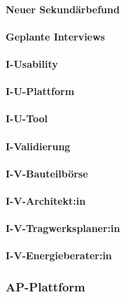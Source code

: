 \documentclass[type=zwischenbericht]{zukunftbau}
\begin{document}
\paragraph{Neuer Sekundärbefund}
\begin{SemioNest}
\paragraph{Geplante Interviews}
\begin{SemioNest}
\paragraph{I-Usability}
\begin{SemioNest}
\paragraph{I-U-Plattform}
\paragraph{I-U-Tool}
\end{SemioNest}
\paragraph{I-Validierung}
\begin{SemioNest}
\paragraph{I-V-Bauteilbörse}
\paragraph{I-V-Architekt:in}
\paragraph{I-V-Tragwerksplaner:in}
\paragraph{I-V-Energieberater:in}
\end{SemioNest}
\end{SemioNest}
\end{SemioNest}

\subsubsection{AP-Plattform}
\end{document}
